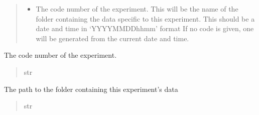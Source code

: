 \documentclass[letterpaper,10pt,english]{sphinxmanual}
\begin{document}
\begin{fulllineitems}
\begin{quote}
\begin{description}
\begin{itemize}
\item {} 
\sphinxAtStartPar
{} \textendash{} The code number of the experiment.
This will be the name of the folder containing the data specific to
this experiment.
This should be a date and time in ‘YYYY\sphinxhyphen{}MM\sphinxhyphen{}DD\sphinxhyphen{}hhmm’ format
If no code is given, one will be generated from the current date
and time.

\end{itemize}

\end{description}\end{quote}

\begin{fulllineitems}
\label{\detokenize{lysis.util:lysis.util.parameters.Experiment.experiment_code}}
\pysigstartsignatures
{}
\pysigstopsignatures
\sphinxAtStartPar
The code number of the experiment.
\begin{quote}\begin{description}
\sphinxAtStartPar
str

\end{description}\end{quote}

\end{fulllineitems}


\begin{fulllineitems}
\label{\detokenize{lysis.util:lysis.util.parameters.Experiment.os_path}}
\pysigstartsignatures
{}
\pysigstopsignatures
\sphinxAtStartPar
The path to the folder containing this experiment’s data
\begin{quote}\begin{description}
\sphinxAtStartPar
str

\end{description}\end{quote}

\end{fulllineitems}



\end{fulllineitems}
\end{document}
